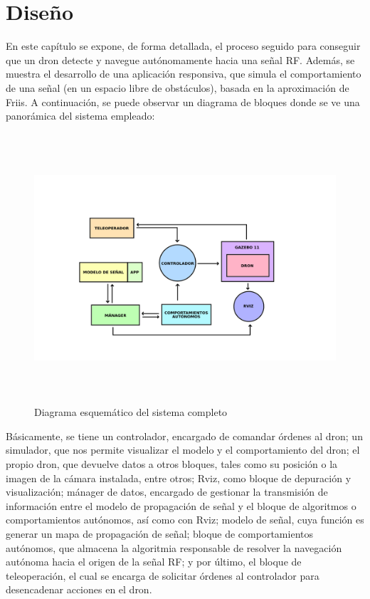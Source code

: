 \chapter{Diseño}
\label{cap:capitulo4}

En este capítulo se expone, de forma detallada, el proceso seguido para conseguir que un dron detecte y navegue autónomamente hacia una señal \ac{RF}. Además, se muestra el desarrollo de una aplicación responsiva, que simula el comportamiento de una señal (en un espacio libre de obstáculos), basada en la aproximación de Friis. A continuación, se puede observar un diagrama de bloques donde se ve una panorámica del sistema empleado:\\

\begin{figure} [H]
	\begin{center}
	\includegraphics[height=10cm]{imagenes/cap4/0_diagrama_general.png}
	\end{center}
	\caption[Diagrama esquemático del sistema completo]{Diagrama esquemático del sistema completo}
	\label{fig:diagrama}
\end{figure}

Básicamente, se tiene un controlador, encargado de comandar órdenes al dron; un simulador, que nos permite visualizar el modelo y el comportamiento del dron; el propio dron, que devuelve datos a otros bloques, tales como su posición o la imagen de la cámara instalada, entre otros; Rviz, como bloque de depuración y visualización; mánager de datos, encargado de gestionar la transmisión de información entre el modelo de propagación de señal y el bloque de algoritmos o comportamientos autónomos, así como con Rviz; modelo de señal, cuya función es generar un mapa de propagación de señal; bloque de comportamientos autónomos, que almacena la algoritmia responsable de resolver la navegación autónoma hacia el origen de la señal \ac{RF}; y por último, el bloque de teleoperación, el cual se encarga de solicitar órdenes al controlador para desencadenar acciones en el dron.

